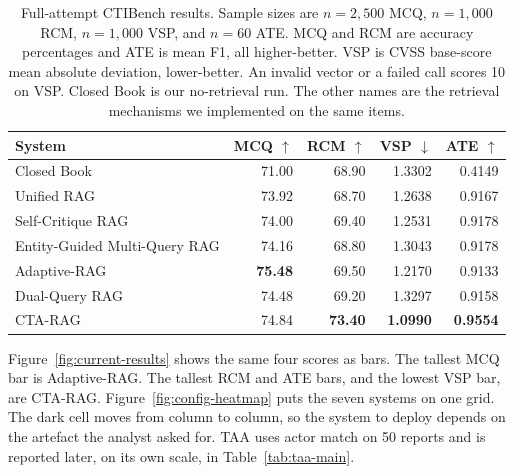\documentclass[5p,times,authoryear]{elsarticle}
\begin{document}
\begin{table}[t]
\centering
\small
\caption{Full-attempt CTIBench results. Sample sizes are $n{=}2{,}500$ MCQ, $n{=}1{,}000$ RCM, $n{=}1{,}000$ VSP, and $n{=}60$ ATE. MCQ and RCM are accuracy percentages and ATE is mean F1, all higher-better. VSP is CVSS base-score mean absolute deviation, lower-better. An invalid vector or a failed call scores 10 on VSP. Closed Book is our no-retrieval run. The other names are the retrieval mechanisms we implemented on the same items.}
\label{tab:main}
\setlength{\tabcolsep}{5pt}
\begin{tabular}{@{}lrrrr@{}}
\toprule
System & MCQ $\uparrow$ & RCM $\uparrow$ & VSP $\downarrow$ & ATE $\uparrow$ \\
\midrule
Closed Book                    & 71.00 & 68.90 & 1.3302 & 0.4149 \\
Unified RAG                    & 73.92 & 68.70 & 1.2638 & 0.9167 \\
Self-Critique RAG              & 74.00 & 69.40 & 1.2531 & 0.9178 \\
Entity-Guided Multi-Query RAG  & 74.16 & 68.80 & 1.3043 & 0.9178 \\
Adaptive-RAG                   & \textbf{75.48} & 69.50 & 1.2170 & 0.9133 \\
Dual-Query RAG                 & 74.48 & 69.20 & 1.3297 & 0.9158 \\
CTA-RAG                        & 74.84 & \cellcolor{ctagood}\textbf{73.40} & \cellcolor{ctagood}\textbf{1.0990} & \cellcolor{ctagood}\textbf{0.9554} \\
\bottomrule
\end{tabular}
\end{table}

Figure~\ref{fig:current-results} shows the same four scores as bars. The tallest MCQ bar is Adaptive-RAG. The tallest RCM and ATE bars, and the lowest VSP bar, are CTA-RAG. Figure~\ref{fig:config-heatmap} puts the seven systems on one grid. The dark cell moves from column to column, so the system to deploy depends on the artefact the analyst asked for. TAA uses actor match on 50 reports and is reported later, on its own scale, in Table~\ref{tab:taa-main}.
\end{document}
